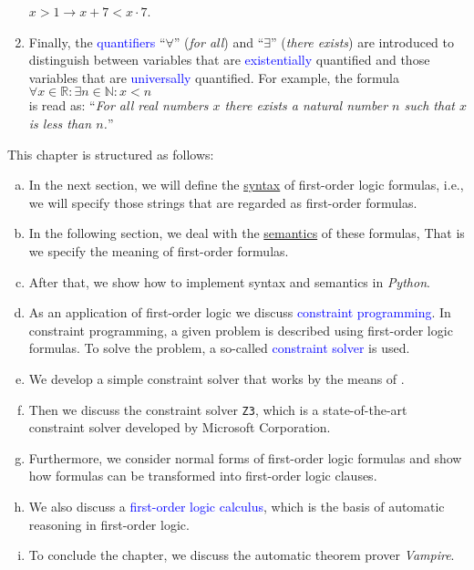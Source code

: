 \begin{enumerate}
      $x > 1 \rightarrow x + 7 < x \cdot  7$.
\item Finally, the \textcolor{blue}{quantifiers} ``$\forall$'' (\emph{for all}) and
      ``$\exists$'' (\emph{there exists}) are introduced to distinguish between variables that are
      \textcolor{blue}{existentially} quantified and those variables that are \textcolor{blue}{universally}
      quantified.  For example, the formula 
      \\[0.2cm]
      \hspace*{1.3cm}
      $\forall x \in \mathbb{R}: \exists n \in \mathbb{N}: x < n$
      \\[0.2cm]
      is read as: ``\textsl{For all real numbers $x$ there exists a natural number $n$ such that $x$ is less
        than $n$.}''
\end{enumerate}
This chapter is structured as follows:
\begin{enumerate}[(a)]
\item In the next section, we will define the \href{https://en.wikipedia.org/wiki/Syntax}{syntax} of
      first-order logic formulas, i.e., we will specify those strings that are regarded as first-order
      formulas.
\item In the following section, we deal with the
      \href{https://en.wikipedia.org/wiki/Semantics}{semantics} of these formulas, That is we specify the 
      meaning of first-order formulas.
\item After that, we show how to implement syntax and semantics in \textsl{Python}.
\item As an application of first-order logic we discuss \textcolor{blue}{constraint programming}.
      In constraint programming, a given problem is described using first-order logic formulas.
      To solve the problem, a so-called \textcolor{blue}{constraint solver} is used.
\item We develop a simple constraint solver that works by the means of .
\item Then we discuss the constraint solver \texttt{Z3}, which is a state-of-the-art constraint solver
      developed by Microsoft Corporation.
\item Furthermore, we consider normal forms of first-order logic formulas and show how formulas
      can be transformed into first-order logic clauses.
\item We also discuss a \textcolor{blue}{first-order logic calculus}, which is the basis
      of automatic reasoning in first-order logic.
\item To conclude the chapter, we discuss the automatic theorem prover \textsl{Vampire}.
\end{enumerate}

